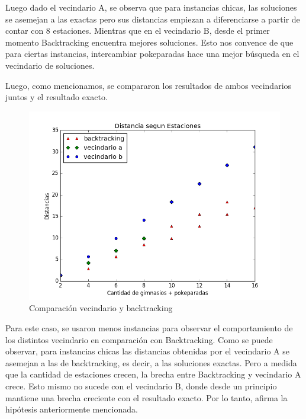 \par Luego dado el vecindario A, se observa que para instancias chicas, las soluciones se asemejan a las exactas pero sus distancias empiezan a diferenciarse a partir de contar con 8 estaciones. Mientras que en el vecindario B, desde el primer momento Backtracking encuentra mejores soluciones. Esto nos convence de que  para ciertas instancias, intercambiar pokeparadas hace una mejor búsqueda en el vecindario de soluciones. 

Luego, como mencionamos, se compararon los resultados de ambos vecindarios juntos y el resultado exacto.

  \begin{figure}[H]
      \begin{center}
        \includegraphics[width=0.7\columnwidth]{imagenes/Exp2Ej3TODO.png}
        \caption{Comparación vecindario y backtracking}
      \end{center}
  \end{figure}


Para este caso, se usaron menos instancias para observar el comportamiento de los distintos vecindario en comparación con Backtracking.  Como se puede observar, para instancias chicas las distancias obtenidas por el vecindario A se asemejan a las de backtracking, es decir, a las soluciones exactas. Pero a medida que la cantidad de estaciones crecen, la brecha entre Backtracking y vecindario A crece. Esto mismo no sucede con el vecindario B, donde desde un principio mantiene una brecha creciente con el resultado exacto. Por lo tanto, afirma la hipótesis anteriormente mencionada.